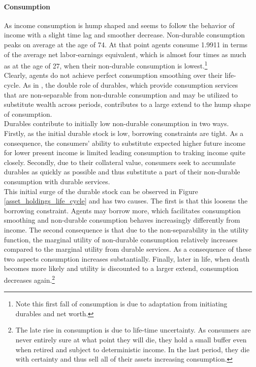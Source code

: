 \documentclass[12pt,a4paper,leqno]{article}
\theoremstyle{definition}
\begin{document}
\paragraph{Consumption} As income consumption is hump shaped and seems to follow the behavior of income with a slight time lag and smoother decrease. Non-durable consumption peaks on average at the age of 74. At that point agents consume 1.9911 in terms of the average net labor-earnings equivalent, which is almost four times as much as at the age of 27, when their non-durable consumption is lowest.\footnote{Note this first fall of consumption is due to adaptation from initiating durables and net worth.} \\
Clearly, agents do not achieve perfect consumption smoothing over their life-cycle. As in \cite{FV&K2011}, the double role of durables, which provide consumption services that are non-separable from non-durable consumption and may be utilized to substitute wealth across periods, contributes to a large extend to the hump shape of consumption.\\
Durables contribute to initially low non-durable consumption in two ways. Firstly, as the initial durable stock is low, borrowing constraints are tight. As a consequence, the consumers' ability to substitute expected higher future income for lower present income is limited leading consumption to traking income quite closely. Secondly, 
due to their collateral value, consumers seek to accumulate durables as quickly as possible and thus substitute a part of their non-durable consumption with durable services. \\
This initial surge of the durable stock can be observed in Figure \ref{asset_holdings_life_cycle} and has two causes. The first is that this loosens the borrowing constraint. Agents may borrow more, which facilitates consumption smoothing and non-durable consumption behaves increasingly differently from income. The second consequence is that due to the non-separability in the utility function, the marginal utility of non-durable consumption relatively increases compared to the marginal utility from durable services. As a consequence of these two aspects consumption increases substantially. 
Finally, later in life, when death becomes more likely and utility is discounted to a larger extend, consumption decreases again.\footnote{The late rise in consumption is due to life-time uncertainty. As consumers are never entirely sure at what point they will die, they hold a small buffer even when retired and subject to deterministic income. In the last period, they die with certainty and thus sell all of their assets increasing consumption.} 
\end{document}
